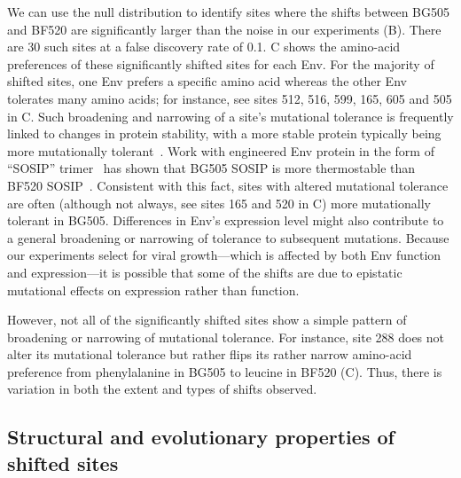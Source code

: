 \documentclass[9pt]{elife}
\begin{document}
We can use the null distribution to identify sites where the shifts between BG505 and BF520 are significantly larger than the noise in our experiments (B).
There are 30 such sites at a false discovery rate of 0.1.
C shows the amino-acid preferences of these significantly shifted sites for each Env.
For the majority of shifted sites, one Env prefers a specific amino acid whereas the other Env tolerates many amino acids; for instance, see sites 512, 516, 599, 165, 605 and 505 in C.
Such broadening and narrowing of a site's mutational tolerance is frequently linked to changes in protein stability, with a more stable protein typically being more mutationally tolerant~\citep{wang2002evolution,bloom2006protein,gong2013stability,kumar2017stability}.
Work with engineered Env protein in the form of ``SOSIP'' trimer~\citep{binley2000recombinant,sanders2002stabilization} has shown that BG505 SOSIP is more thermostable than BF520 SOSIP~\citep{verkerke2016epitope}.
Consistent with this fact, sites with altered mutational tolerance are often (although not always, see sites 165 and 520 in C) more mutationally tolerant in BG505.
Differences in Env's expression level might also contribute to a general broadening or narrowing of tolerance to subsequent mutations.
Because our experiments select for viral growth---which is affected by both Env function and expression---it is possible that some of the shifts are due to epistatic mutational effects on expression rather than function.

However, not all of the significantly shifted sites show a simple pattern of broadening or narrowing of mutational tolerance.
For instance, site 288 does not alter its mutational tolerance but rather flips its rather narrow amino-acid preference from phenylalanine in BG505 to leucine in BF520 (C).
Thus, there is variation in both the extent and types of shifts observed.

\subsection{Structural and evolutionary properties of shifted sites}
\end{document}

